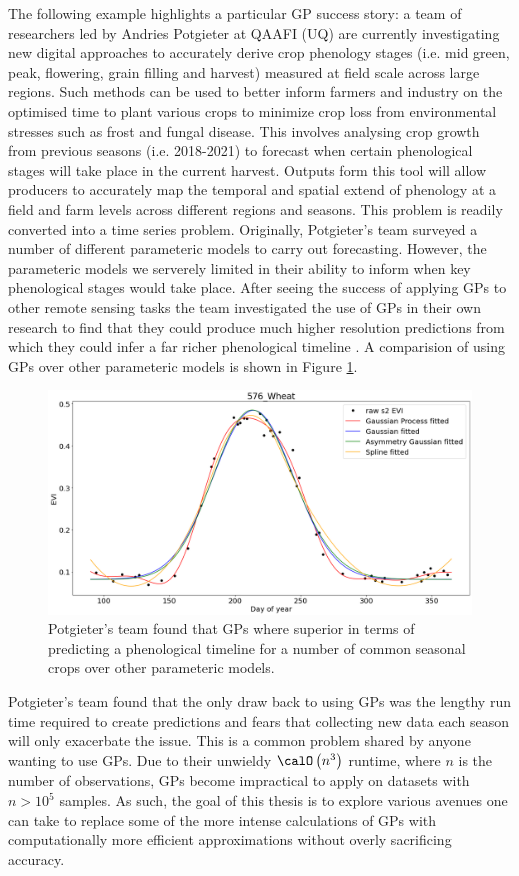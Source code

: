 The following example highlights a particular GP success story: a team of researchers led by Andries Potgieter at QAAFI (UQ) are currently investigating new digital approaches to accurately derive crop phenology stages (i.e. mid green, peak, flowering, grain filling and harvest) measured at field scale across large regions. Such methods can be used to better inform farmers and industry on the optimised time to plant various crops to minimize crop loss from environmental stresses such as frost and fungal disease. This involves analysing crop growth from previous seasons (i.e. 2018-2021) to forecast when certain phenological stages will take place in the current harvest. Outputs form this tool will allow producers to accurately map the temporal and spatial extend of phenology at a field and farm levels across different regions and seasons. This problem is readily converted into a time series problem. Originally, Potgieter's team surveyed a number of different parameteric models to carry out forecasting. However, the parameteric models we serverely limited in their ability to inform when key phenological stages would take place. After seeing the success of applying GPs to other remote sensing tasks \cite{rs14010146} the team investigated the use of GPs in their own research to find that they could produce much higher resolution predictions from which they could infer a far richer phenological timeline \cite{potg2013}. A comparision of using GPs over other parameteric models is shown in Figure \ref{fig: GP_motivate_wheat}.
\begin{figure}[ht]
    \centering
    \includegraphics[scale=0.3]{img/yan_wheat_GPR_plot.png}
    \caption{Potgieter's team found that GPs where superior in terms of predicting a phenological timeline for a number of common seasonal crops over other parameteric models.}
    \label{fig: GP_motivate_wheat}
\end{figure}
Potgieter's team found that the only draw back to using GPs was the lengthy run time required to create predictions and fears that collecting new data each season will only exacerbate the issue. This is a common problem shared by anyone wanting to use GPs. Due to their unwieldy $\calO \left( n^3 \right)$ runtime, where $n$ is the number of observations, GPs become impractical to apply on datasets with $n > 10^5$ samples. As such, the goal of this thesis is to explore various avenues one can take to replace some of the more intense calculations of GPs with computationally more efficient approximations without overly sacrificing accuracy.

